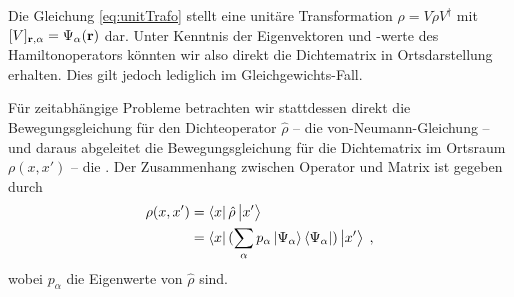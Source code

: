 Die Gleichung \eqref{eq:unitTrafo} stellt eine unitäre Transformation $\rho = V\tilde{\rho}V^{\dagger}$ mit $[V]_{\vb{r},\alpha} = \Psi_{\alpha}(\vb{r})$ dar. Unter Kenntnis der Eigenvektoren und -werte des Hamiltonoperators könnten wir also direkt die Dichtematrix in Ortsdarstellung erhalten. Dies gilt jedoch lediglich im Gleichgewichts-Fall.

Für zeitabhängige Probleme betrachten wir stattdessen direkt die Bewegungsgleichung für den Dichteoperator $\hat{\rho}$ -- die von-Neumann-Gleichung -- und daraus abgeleitet die Bewegungsgleichung für die Dichtematrix im Ortsraum $\rho(x,x')$ -- die \lvn. Der Zusammenhang zwischen Operator und Matrix ist gegeben durch
\begin{align}
  \rho(x,x') &= \bra{x} \hat{\rho} \ket{x'} \\
  &= \bra{x} (\sum_{\alpha} p_{\alpha} \ket{\Psi_{\alpha}}\bra{\Psi_{\alpha}}) \ket{x'} \; ,
\end{align}
wobei $p_{\alpha}$ die Eigenwerte von $\hat{\rho}$ sind.

